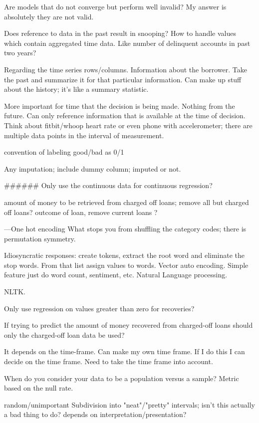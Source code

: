 Are models that do not converge but perform well invalid?
My answer is absolutely they are not valid. 


Does reference to data in the past result in snooping?
How to handle values which contain aggregated time data. Like number of delinquent accounts in
past two years?

Regarding the time series rows/columns. Information about the borrower. 
Take the past and summarize it for that particular information. 
Can make up stuff about the history; it's like a summary statistic. 

More important for time that the decision is being made. 
Nothing from the future. Can only reference information that
is available at the time of decision. Think about fitbit/whoop
heart rate or even phone with accelerometer; there are multiple
data points in the interval of measurement. 

convention of labeling good/bad as 0/1

Any imputation; include dummy column; imputed or not. 

######
Only use the continuous data for continuous regression?

amount of money to be retrieved from charged off loans; remove all but
charged off loans? outcome of loan, remove current loans ?

---One hot encoding 
What stops you from shuffling the category codes; there is permutation
symmetry. 

Idiosyncratic responses: create tokens, extract the root word and
eliminate the stop words. From that list assign values to words. Vector
auto encoding. Simple feature just do word count, sentiment, etc. Natural
Language processing. 

NLTK.

Only use regression on values greater than zero for recoveries?

If trying to predict the amount of money recovered from charged-off loans should only the charged-off loan data be used?

It depends on the time-frame. Can make my own time frame. If I do this
I can decide on the time frame. Need to take the time frame into account.

When do you consider your data to be a population versus a sample?
Metric based on the null rate. 

random/unimportant
Subdivision into "neat"/"pretty" intervals; isn't this actually a bad thing to do?
depends on interpretation/presentation?


